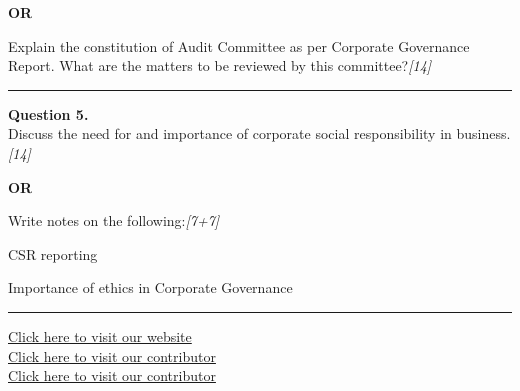 \documentclass[11pt,a4paper]{article}
\newcommand{\pts}[1]{\hfill   \textit{[#1]}}
\begin{document}
\centerline{   \textbf{OR}}

Explain the constitution of Audit Committee as per Corporate Governance Report. What are the matters to be reviewed by this committee?\pts{14}

\medskip\rule{\linewidth}{0.2pt}




\noindent   \textbf{Question 5.} \\
Discuss the need for and importance of corporate social responsibility in business.\pts{14}

\centerline{   \textbf{OR}}

Write notes on the following:\pts{7+7}

\begin{parts}
  \item CSR reporting
  \item Importance of ethics in Corporate Governance
\end{parts}

\vfill
\rule{\linewidth}{0.4pt}

\begin{center}\small
\href{https://bhu-exam.vercel.app/}{Click here to visit our website}\\[4pt]
\href{https://me-aryan.vercel.app/}{Click here to visit our contributor}\\[4pt]
\href{https://quashan-me.vercel.app/}{Click here to visit our contributor}
\end{center}
\end{document}
